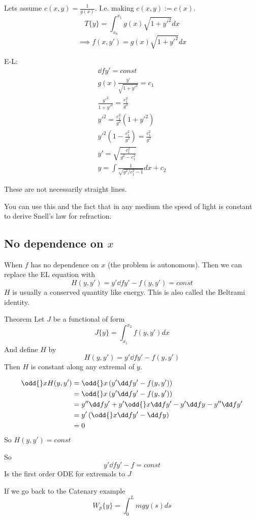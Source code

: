 \documentclass{X:/Documents/Coding/Latex/myassignment}
\begin{document}
Lets assume $c(x,y) = \frac{1}{g(x)}$. I.e. making $c(x,y) := c(x)$.
\[T\{y\} = \int_{x_0}^{x_1} g(x)\sqrt{1+y'^2} dx\]
\[\implies f(x,y') = g(x) \sqrt{1+y'^2} dx\]

E-L:
\begin{align*}
	\dd f{y'} = const\\
	g(x) \frac{y'}{\sqrt{1+y'^2}} = c_1\\
	\frac{y'^2}{1+y'^2} = \frac{c_1^2}{g^2}\\
	y'^2 = \frac{c_1^2}{g^2} (1+y'^2)\\
	y'^2\left(1- \frac{c_1^2}{g^2}\right) = \frac{c_1^2}{g^2}\\
	y' = \sqrt{\frac{c_1^2}{g^2 - c_1^2}}\\
	y = \int \frac{1}{\sqrt{g^2/c_1^2 - 1}} dx+ c_2  
\end{align*}

These are not necessarily straight lines.

You can use this and the fact that in any medium the speed of light is constant to derive Snell's law for refraction.

\subsection{No dependence on $x$}
When $f$ has no dependence on $x$ (the problem is autonomous). Then we can replace the EL equation with
\[H(y,y') = y' \dd f{y'} - f(y,y') = const\]
$H$ is usually a conserved quantity like energy. This is also called the Beltrami identity.

Theorem Let $J$ be a functional of form
\[J\{y\} = \int_{x_1}^{x_2} f(y,y') dx\]
And define $H$ by
\[H(y,y') = y' \dd f{y'} - f(y,y')\]
Then $H$ is constant along any extremal of $y$.

\begin{align*}
	\odd{}x H(y,y') &= \odd{}x \left(y' \dd f{y'} - f(y,y')\right)\\
	&= \odd{}x \left(y' \dd f{y'} - f(y,y')\right)\\
	&= y'' \dd fy' + y' \odd{}x \dd fy' - y' \dd fy - y'' \dd f{y'}\\
	&= y'\left(\odd{}x \dd f{y'} - \dd fy\right)\\
	&= 0 
\end{align*}
So $H(y,y') = const$

So
\[y' \dd f{y'} -f = const\]
Is the first order ODE for extremals to $J$


If we go back to the Catenary example
\[W_p \{y\} = \int_0^L mg y(s) ds\]
\end{document}
